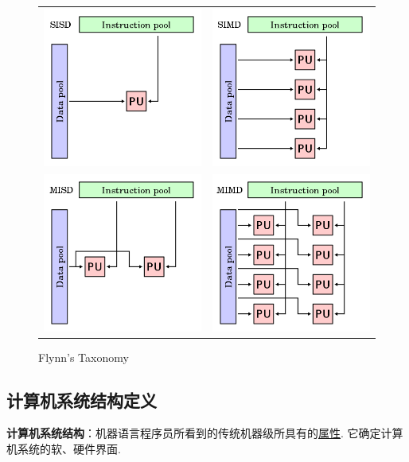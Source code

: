 \documentclass[cn, hazy, blue, normal, 12pt]{elegantnote}
\begin{document}
\begin{figure}
    \centering
    \begin{tabular}{cc}
        \includegraphics[width=0.3\linewidth]{./images/SISD.png} &
        \includegraphics[width=0.3\linewidth]{./images/SIMD.png}   \\
        \includegraphics[width=0.3\linewidth]{./images/MISD.png} &
        \includegraphics[width=0.3\linewidth]{./images/MIMD.png}   \\
    \end{tabular}
    \caption{Flynn's Taxonomy}
\end{figure}

\subsection{计算机系统结构定义}

\textbf{计算机系统结构}：机器语言程序员所看到的传统机器级所具有的\underline{属性}. 它确定计算机系统的软、硬件界面.
\end{document}
